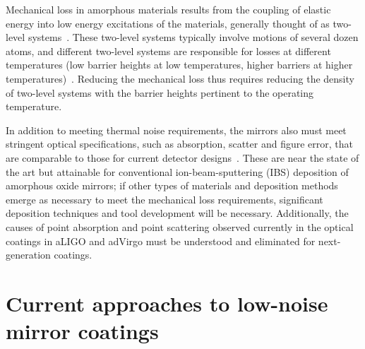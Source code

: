 Mechanical loss in amorphous materials results from the coupling of elastic energy into low energy excitations of the materials, generally thought of as two-level systems~\cite{braginsky1985systems,bommel1956dislocations}.
These two-level systems typically involve motions of several dozen atoms, and different two-level systems are responsible for losses at different temperatures (low barrier heights at low temperatures, higher barriers at higher temperatures)~\cite{hamdan2014molecular,trinastic2016molecular}. Reducing the mechanical loss thus requires reducing the density of two-level systems with the barrier heights pertinent to the operating temperature. 

In addition to meeting thermal noise requirements, the mirrors also must meet stringent optical specifications, such as absorption, scatter and figure error, that are comparable to those for current detector designs~\cite{AdvancedVirgo2015, AdvancedLIGO2015}. These are near the state of the art but attainable for conventional ion-beam-sputtering (IBS) deposition of amorphous oxide mirrors; if other types of materials and deposition methods emerge as necessary to meet the mechanical loss requirements, significant deposition techniques and tool development will be necessary. Additionally, the causes of point absorption and point scattering observed currently in the optical coatings in aLIGO and adVirgo must be understood and eliminated for next-generation coatings. 

\section{Current approaches to low-noise mirror coatings}

